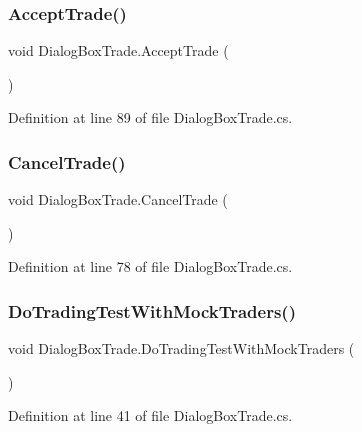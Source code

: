 \subsubsection{\texorpdfstring{Accept\+Trade()}{AcceptTrade()}}
{\footnotesize\ttfamily void Dialog\+Box\+Trade.\+Accept\+Trade (\begin{DoxyParamCaption}{ }\end{DoxyParamCaption})}



Definition at line 89 of file Dialog\+Box\+Trade.\+cs.

\mbox{\label{class_dialog_box_trade_a87df18554b7947420277cd1e9f0ee93b}} 
\subsubsection{\texorpdfstring{Cancel\+Trade()}{CancelTrade()}}
{\footnotesize\ttfamily void Dialog\+Box\+Trade.\+Cancel\+Trade (\begin{DoxyParamCaption}{ }\end{DoxyParamCaption})}



Definition at line 78 of file Dialog\+Box\+Trade.\+cs.

\mbox{\label{class_dialog_box_trade_a9ce90e25a84129f12e38ad55990638ed}} 
\subsubsection{\texorpdfstring{Do\+Trading\+Test\+With\+Mock\+Traders()}{DoTradingTestWithMockTraders()}}
{\footnotesize\ttfamily void Dialog\+Box\+Trade.\+Do\+Trading\+Test\+With\+Mock\+Traders (\begin{DoxyParamCaption}{ }\end{DoxyParamCaption})}



Definition at line 41 of file Dialog\+Box\+Trade.\+cs.

\mbox{\label{class_dialog_box_trade_a12e9eeb81e93b96ccbfa219fb1f8d05a}} 
